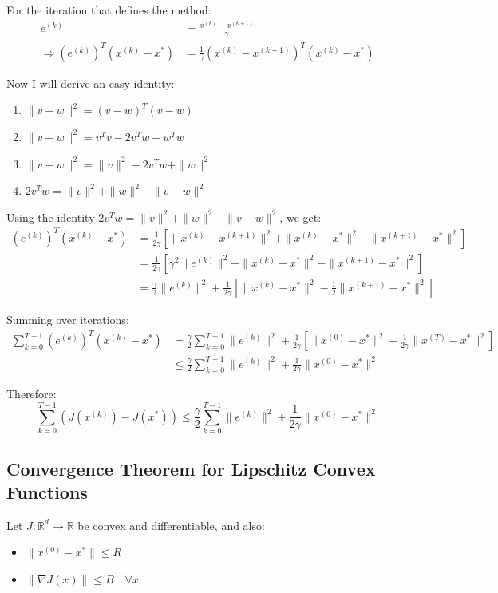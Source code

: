 For the iteration that defines the method:
\[
\begin{aligned}
e^{(k)} &= \frac{x^{(k)} - x^{(k+1)}}{\gamma} \\
\Rightarrow (e^{(k)})^T(x^{(k)} - x^*) &= \frac{1}{\gamma}(x^{(k)} - x^{(k+1)})^T(x^{(k)} - x^*)
\end{aligned}
\]

Now I will derive an easy identity:
\begin{enumerate}
\item \(\|v - w\|^2 = (v - w)^T (v - w)\)\\
\item \(\|v - w\|^2 = v^T v - 2v^T w + w^T w\)\\
\item \(\|v - w\|^2 = \|v\|^2 - 2v^T w + \|w\|^2\)\\
\item \(2v^T w = \|v\|^2 + \|w\|^2 - \|v - w\|^2\)\\
\end{enumerate}
Using the identity $2v^Tw = \|v\|^2 + \|w\|^2 - \|v-w\|^2$, we get:
\[
\begin{aligned}
(e^{(k)})^T(x^{(k)} - x^*) &= \frac{1}{2\gamma}[\|x^{(k)} - x^{(k+1)}\|^2 + \|x^{(k)} - x^*\|^2 - \|x^{(k+1)} - x^*\|^2] \\
&= \frac{1}{2\gamma}[\gamma^2\|e^{(k)}\|^2 + \|x^{(k)} - x^*\|^2 - \|x^{(k+1)} - x^*\|^2] \\
&= \frac{\gamma}{2}\|e^{(k)}\|^2 + \frac{1}{2\gamma}[\|x^{(k)} - x^*\|^2 - \frac{1}{2}\|x^{(k+1)} - x^*\|^2]
\end{aligned}
\]

Summing over iterations:
\[
\begin{aligned}
\sum_{k=0}^{T-1}(e^{(k)})^T(x^{(k)} - x^*) &= \frac{\gamma}{2}\sum_{k=0}^{T-1}\|e^{(k)}\|^2 + \frac{1}{2\gamma}[\|x^{(0)} - x^*\|^2 -\frac{1}{2\gamma} \|x^{(T)} - x^*\|^2] \\
&\leq \frac{\gamma}{2}\sum_{k=0}^{T-1}\|e^{(k)}\|^2 + \frac{1}{2\gamma}\|x^{(0)} - x^*\|^2
\end{aligned}
\]

Therefore:
\[
\sum_{k=0}^{T-1}(J(x^{(k)}) - J(x^*)) \leq \frac{\gamma}{2}\sum_{k=0}^{T-1}\|e^{(k)}\|^2 + \frac{1}{2\gamma}\|x^{(0)} - x^*\|^2
\]

\subsection{Convergence Theorem for Lipschitz Convex Functions}
Let $J: \mathbb{R}^d \to \mathbb{R}$ be convex and differentiable, and also:
\begin{itemize}
    \item $\|x^{(0)} - x^*\| \leq R$
    \item $\|\nabla J(x)\| \leq B \quad \forall x$
\end{itemize}

